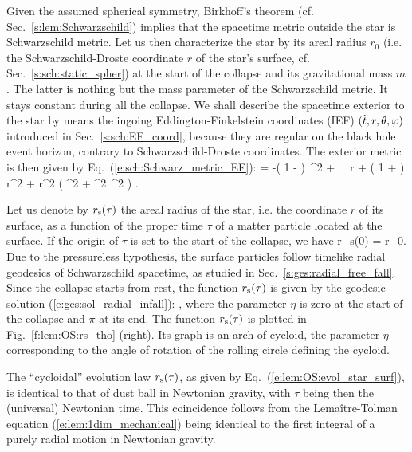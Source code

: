 Given the assumed spherical symmetry, Birkhoff's theorem (cf. Sec.~\ref{s:lem:Schwarzschild})
implies that the spacetime metric outside the star
is Schwarzschild metric.
Let us then characterize the star by its areal radius $r_0$
(i.e. the Schwarzschild-Droste coordinate $r$ of the star's surface, cf. Sec.~\ref{s:sch:static_spher})
at the start of the collapse and its gravitational mass $m$. The latter
is nothing but the mass parameter of the Schwarzschild metric. It stays
constant during all the collapse.
We shall describe the spacetime exterior
to the star by means the ingoing Eddington-Finkelstein coordinates (IEF)
$({\tilde t}, r, \theta,\varphi)$
introduced in Sec.~\ref{s:sch:EF_coord}, because they are regular on the
black hole event horizon, contrary to Schwarzschild-Droste coordinates.
The exterior metric is then given by Eq.~(\ref{e:sch:Schwarz_metric_EF}):
\be \label{e:lem:OS:exterior_metric}
     =
            -\left( 1 -  \right)\, \dd \ti^2
            +  \, \dd \ti \, \dd r
            + \left( 1 +  \right)\, \dd r^2
        + r^2 \left( \dd\th^2 + \sin^2\th\, \dd\ph^2 \right) .
\ee

Let us denote by $r_{\rm s}(\tau)$ the areal radius of the star, i.e. the coordinate $r$
of its surface, as a function of the proper time $\tau$ of a matter particle
located at the surface. If the origin of $\tau$ is set to
the start of the collapse, we have
\be
    r_{\rm s}(0) = r_0.
\ee
Due to the pressureless hypothesis, the surface particles follow timelike radial geodesics
of Schwarzschild spacetime, as studied in Sec.~\ref{s:ges:radial_free_fall}.
Since the collapse starts from rest, the function $r_{\rm s}(\tau)$ is
given by the geodesic solution (\ref{e:ges:sol_radial_infall}):
\be \label{e:lem:OS:evol_star_surf}
     \leq \eta \leq \pi ,
\ee
where the parameter $\eta$ is zero at the start of the collapse and $\pi$ at its end.
The function $r_{\rm s}(\tau)$ is plotted in Fig.~\ref{f:lem:OS:rs_tho} (right).
Its graph is an arch of cycloid, the parameter $\eta$ corresponding
to the angle of rotation of the rolling circle defining the cycloid.
\begin{remark} \label{r:lem:OS:cycloid}
The ``cycloidal'' evolution law $r_{\rm s}(\tau)$, as given by Eq.~(\ref{e:lem:OS:evol_star_surf}),
is identical to that of dust ball in Newtonian gravity, with $\tau$ being then the (universal) Newtonian
time. This coincidence follows from the Lemaître-Tolman equation (\ref{e:lem:1dim_mechanical})
being identical to the first integral of a purely radial motion in Newtonian gravity.
\end{remark}

